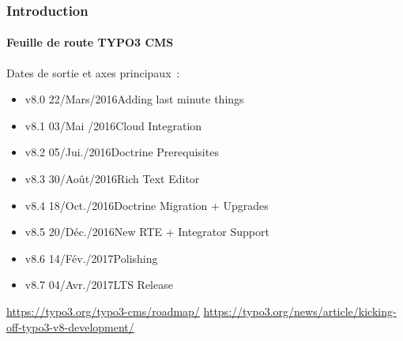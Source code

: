 \begin{frame}[fragile]
	\frametitle{Introduction}
	\framesubtitle{Feuille de route TYPO3 CMS}

	Dates de sortie et axes principaux~:

	\begin{itemize}

		\item v8.0 \tabto{1.1cm}22/Mars/2016\tabto{3.4cm}Adding last minute things
		\item v8.1 \tabto{1.1cm}03/Mai /2016\tabto{3.4cm}Cloud Integration
		\item v8.2 \tabto{1.1cm}05/Jui./2016\tabto{3.4cm}Doctrine Prerequisites
		\item v8.3 \tabto{1.1cm}30/Août/2016\tabto{3.4cm}Rich Text Editor
		\item v8.4 \tabto{1.1cm}18/Oct./2016\tabto{3.4cm}Doctrine Migration + Upgrades
		\item v8.5 \tabto{1.1cm}20/Déc./2016\tabto{3.4cm}New RTE + Integrator Support
		\item v8.6 \tabto{1.1cm}14/Fév./2017\tabto{3.4cm}Polishing
		\item
			\begingroup
				\color{typo3orange}
					v8.7 \tabto{1.1cm}04/Avr./2017\tabto{3.4cm}LTS Release
			\endgroup

	\end{itemize}

	\smaller
		\url{https://typo3.org/typo3-cms/roadmap/}\newline
		\url{https://typo3.org/news/article/kicking-off-typo3-v8-development/}
	\normalsize

\end{frame}

